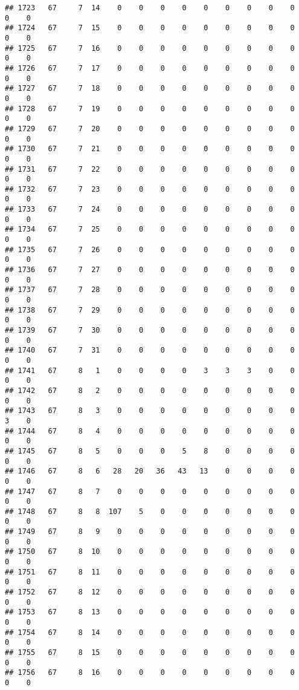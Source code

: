 \documentclass[]{article}
\begin{document}
\begin{verbatim}
## 1723   67     7  14    0    0    0    0    0    0    0    0    0    0    0
## 1724   67     7  15    0    0    0    0    0    0    0    0    0    0    0
## 1725   67     7  16    0    0    0    0    0    0    0    0    0    0    0
## 1726   67     7  17    0    0    0    0    0    0    0    0    0    0    0
## 1727   67     7  18    0    0    0    0    0    0    0    0    0    0    0
## 1728   67     7  19    0    0    0    0    0    0    0    0    0    0    0
## 1729   67     7  20    0    0    0    0    0    0    0    0    0    0    0
## 1730   67     7  21    0    0    0    0    0    0    0    0    0    0    0
## 1731   67     7  22    0    0    0    0    0    0    0    0    0    0    0
## 1732   67     7  23    0    0    0    0    0    0    0    0    0    0    0
## 1733   67     7  24    0    0    0    0    0    0    0    0    0    0    0
## 1734   67     7  25    0    0    0    0    0    0    0    0    0    0    0
## 1735   67     7  26    0    0    0    0    0    0    0    0    0    0    0
## 1736   67     7  27    0    0    0    0    0    0    0    0    0    0    0
## 1737   67     7  28    0    0    0    0    0    0    0    0    0    0    0
## 1738   67     7  29    0    0    0    0    0    0    0    0    0    0    0
## 1739   67     7  30    0    0    0    0    0    0    0    0    0    0    0
## 1740   67     7  31    0    0    0    0    0    0    0    0    0    0    0
## 1741   67     8   1    0    0    0    0    3    3    3    0    0    0    0
## 1742   67     8   2    0    0    0    0    0    0    0    0    0    0    0
## 1743   67     8   3    0    0    0    0    0    0    0    0    0    3    0
## 1744   67     8   4    0    0    0    0    0    0    0    0    0    0    0
## 1745   67     8   5    0    0    0    5    8    0    0    0    0    0    0
## 1746   67     8   6   28   20   36   43   13    0    0    0    0    0    0
## 1747   67     8   7    0    0    0    0    0    0    0    0    0    0    0
## 1748   67     8   8  107    5    0    0    0    0    0    0    0    0    0
## 1749   67     8   9    0    0    0    0    0    0    0    0    0    0    0
## 1750   67     8  10    0    0    0    0    0    0    0    0    0    0    0
## 1751   67     8  11    0    0    0    0    0    0    0    0    0    0    0
## 1752   67     8  12    0    0    0    0    0    0    0    0    0    0    0
## 1753   67     8  13    0    0    0    0    0    0    0    0    0    0    0
## 1754   67     8  14    0    0    0    0    0    0    0    0    0    0    0
## 1755   67     8  15    0    0    0    0    0    0    0    0    0    0    0
## 1756   67     8  16    0    0    0    0    0    0    0    0    0    0    0

\end{verbatim}
\end{document}
